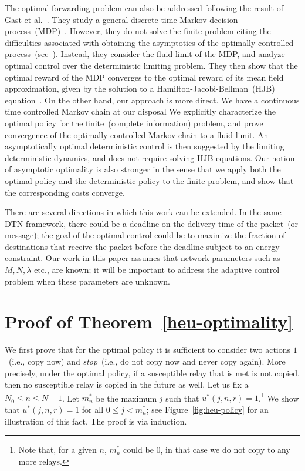 \documentclass[10pt,journal,letterpaper]{IEEEtran}
\newcommand{\remove}[1]{}
\begin{document}
The optimal forwarding problem can also be addressed following the
result of Gast et al.~\cite{stochctrl.gast-etal10mean-field-MDPs}.
They study a general discrete time Markov decision process~(MDP)~\cite{stochctrl.bertsekas07dpoc-vol2}.
However, they do not solve the finite problem citing the difficulties
associated with obtaining the asymptotics of the optimally controlled
process~(see~\cite[Section~3.3]{stochctrl.gast-etal10mean-field-MDPs}).
Instead, they consider the fluid limit
of the MDP, and analyze optimal control over the deterministic limiting problem.
They then show that the optimal reward of the MDP converges to the optimal reward of its
mean field approximation, given by the solution to a Hamilton-Jacobi-Bellman~(HJB)
equation~\cite[Section~3.2]{stochctrl.bertsekas05dpoc-vol1}.
On the other hand, our approach is more direct.
We have a continuous time controlled Markov chain at our disposal
We explicitly characterize the optimal policy for the finite~(complete information) problem,
and prove convergence of the optimally controlled Markov chain to a fluid limit.
An asymptotically optimal deterministic control is then suggested by the limiting deterministic dynamics,
and does not require solving HJB equations. Our notion of asymptotic optimality is also stronger in the
sense that we apply both the optimal policy and the deterministic policy to the finite problem, and show that
the corresponding costs converge.

There are several directions in which this work can be extended.
In the same DTN framework, there could be a deadline on the delivery time of the packet~(or message);
the goal of the optimal control could be to maximize the fraction of destinations that receive
the packet before the deadline subject to an energy constraint. Our work in this paper
assumes that network parameters such as $M,N,\lambda$ etc., are known;
it will be important to address the adaptive control problem when these parameters are unknown.

\appendices
\section{Proof of Theorem~\ref{heu-optimality}}
\label{proof-heu-optimality}

We first prove that for the optimal policy it is sufficient to consider two
actions $1$~(i.e., copy now) and {\it stop}~(i.e., do not copy now and never copy again).
More precisely, under the optimal policy, if a susceptible relay
that is met is not copied, then no susceptible relay is copied in the future as well.
Let us fix a $N_0 \leq n \leq N-1$. Let  $m^{\ast}_n$ be the maximum $j$
such that $u^{\ast}(j,n,r) = 1$.\footnote{Note that, for a given $n$,  $m^{\ast}_n$ could be 0,
in that case we do not copy to any more relays.}
We show that $u^{\ast}(j,n,r) = 1$ for all $0 \leq j < m^{\ast}_n$; see Figure~\ref{fig:heu-policy}
for an illustration of this fact.
The proof is via induction.
\remove{
Let us assume that $u^{\ast}(j,n,r) = 1$ for all $m + 1 \leq j
\leq m^{\ast}_n$. The following results completes the induction step.
}
\end{document}
